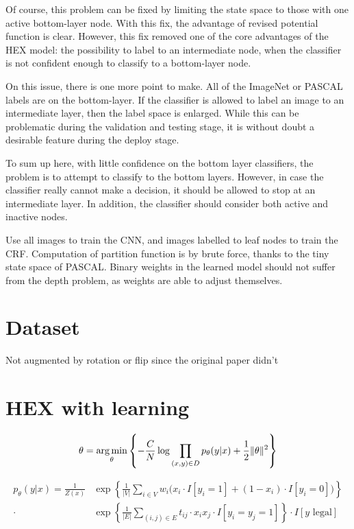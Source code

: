 \documentclass[11pt,a4paper]{article}
\newcommand{\argmin}{\operatornamewithlimits{arg\,min}}
\begin{document}
Of course, this problem can be fixed by limiting the state space to those with one active bottom-layer node. With this fix, the advantage of revised potential function is clear. However, this fix removed one of the core advantages of the HEX model: the possibility to label to an intermediate node, when the classifier is not confident enough to classify to a bottom-layer node.

On this issue, there is one more point to make. All of the ImageNet or PASCAL labels are on the bottom-layer. If the classifier is allowed to label an image to an intermediate layer, then the label space is enlarged. While this can be problematic during the validation and testing stage, it is without doubt a desirable feature during the deploy stage.

To sum up here, with little confidence on the bottom layer classifiers, the problem is to attempt to classify to the bottom layers. However, in case the classifier really cannot make a decision, it should be allowed to stop at an intermediate layer. In addition, the classifier should consider both active and inactive nodes.

Use all images to train the CNN, and images labelled to leaf nodes to train the CRF. Computation of partition function is by brute force, thanks to the tiny state space of PASCAL. Binary weights in the learned model should not suffer from the depth problem, as weights are able to adjust themselves.

\section{Dataset}

Not augmented by rotation or flip since the original paper didn't

\section{HEX with learning}

\[\theta=\argmin_\theta\left\{-\frac{C}{N}\log\prod_{(x,y)\in D}p_\theta(y|x)+\frac{1}{2}\|\theta\|^2\right\}\]

\begin{align*}
p_\theta(y|x)=\frac{1}{Z(x)}&\exp\left\{\frac{1}{|V|}\sum_{i\in V}w_i\big(x_i\cdot I[y_i=1]+(1-x_i)\cdot I[y_i=0]\big)\right\}\\
\cdot&\exp\left\{\frac{1}{|E|}\sum_{(i,j)\in E}t_{ij}\cdot x_ix_j\cdot I[y_i=y_j=1]\right\}\cdot I[y\text{ legal}]
\end{align*}
\end{document}

